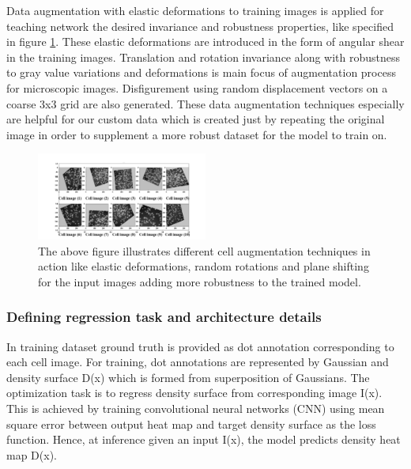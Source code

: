 \documentclass[conference]{IEEEtran}
\begin{document}
Data augmentation with elastic deformations to training images is applied for teaching network the desired invariance and robustness properties, like specified in figure \ref{fig7}. These elastic deformations are introduced in the form of angular shear in the training images. Translation and rotation invariance along with robustness to gray value variations and deformations is main focus of augmentation process for microscopic images. Disfigurement using random displacement vectors on a coarse 3x3 grid are also generated. These data augmentation techniques especially are helpful for our custom data which is created just by repeating the original image in order to supplement a more robust dataset for the model to train on.

\begin{figure}[!h]
\centering
\includegraphics[width=0.50\textwidth]{data-aug-image.png}
\caption{The above figure illustrates different cell augmentation techniques in action like elastic deformations, random rotations and plane shifting for the input images adding more robustness to the trained model.}
\label{fig7}
\end{figure}

\subsubsection{Defining regression task and architecture details}

In training dataset ground truth is provided as dot annotation corresponding to each cell image. For training, dot annotations are represented by Gaussian and density surface D(x) which is formed from superposition of Gaussians. The optimization task is to regress density surface from corresponding image I(x). This is achieved by training convolutional neural networks (CNN) using mean square error between output heat map and target density surface as the loss function. Hence, at inference given an input I(x), the model predicts density heat map D(x).
\end{document}
